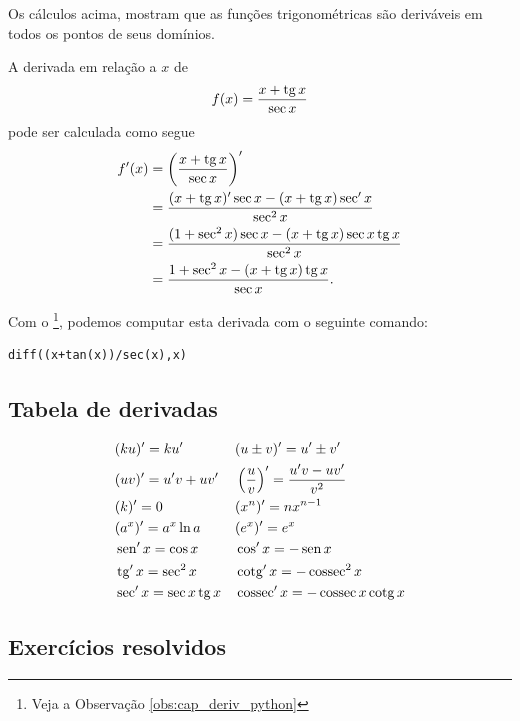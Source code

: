 \begin{obs}
  Os cálculos acima, mostram que as funções trigonométricas são deriváveis em todos os pontos de seus domínios.
\end{obs}

\begin{ex}
  A derivada em relação a $x$ de
  \begin{equation}
    f(x) = \frac{x + \operatorname{tg} x}{\sec x}
  \end{equation}
  pode ser calculada como segue
  \begin{align}
    f'(x) &= \left(\frac{x+\operatorname{tg} x}{\sec x}\right)' \\
          &= \frac{(x+\operatorname{tg} x)'\sec x - (x+\operatorname{tg} x)\sec' x}{\sec^2 x} \\
          &= \frac{(1+\sec^2 x)\sec x - (x+\operatorname{tg} x)\sec x\operatorname{tg} x}{\sec^2 x} \\
          &= \frac{1+\sec^2 x - (x+\operatorname{tg} x)\operatorname{tg} x}{\sec x}.
  \end{align}

  \ifispython
  Com o \sympy\footnote{Veja a Observação \ref{obs:cap_deriv_python}}, podemos computar esta derivada com o seguinte comando:
\begin{verbatim}
diff((x+tan(x))/sec(x),x)
\end{verbatim}
  \fi
\end{ex}

\subsection{Tabela de derivadas}

\begin{align}
  & (ku)' = ku' && (u\pm v)' = u' \pm v'\\
  & (uv)' = u'v + uv' && \left(\frac{u}{v}\right)' = \frac{u'v - uv'}{v^2} \\
  & (k)' = 0 && (x^n)' = nx^{n-1}\\
  & (a^x)' = a^x\ln a && (e^x)' = e^x \\
  & \operatorname{sen}' x = \cos x && \cos' x = - \operatorname{sen} x\\
  & \operatorname{tg}' x = \sec^2 x && \operatorname{cotg}' x = -\operatorname{cossec}^2 x \\
  & \sec' x = \sec x \operatorname{tg} x && \operatorname{cossec}' x = -\operatorname{cossec} x\operatorname{cotg} x
\end{align}

\subsection*{Exercícios resolvidos}

